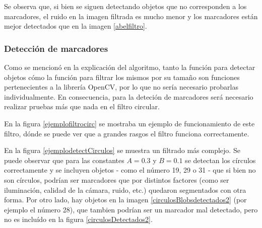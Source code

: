 Se observa que, si bien se siguen detectando objetos que no corresponden a los marcadores, el ruido en la imagen filtrada es mucho menor y los marcadores están mejor detectados que en la imagen \ref{abelfiltro}.

\subsubsection{Detección de marcadores}

Como se mencionó en la explicación del algoritmo, tanto la función para detectar objetos cómo la función para filtrar los mismos por su tamaño son funciones pertenecientes a la librería OpenCV\cite{opencv}, por lo que no sería necesario probarlas individualmente. En consecuencia, para la deteción de marcadores será necesario realizar pruebas más que nada en el filtro circular.

En la figura \ref{ejemplofiltrocirc} se mostraba un ejemplo de funcionamiento de este filtro, dónde se puede ver que a grandes rasgos el filtro funciona correctamente. 

En la figura \ref{ejemplodetectCirculos} se muestra un filtrado más complejo. Se puede observar que para las constantes $A=0.3$ y $B=0.1$ se detectan los círculos correctamente y se incluyen objetos - como el número 19, 29 o 31 - que si bien no son círculos, podrían ser marcadores que por distintos factores (como ser iluminación, calidad de la cámara, ruido, etc.) quedaron segmentados con otra forma. Por otro lado, hay objetos en la imagen \ref{circulosBlobsdetectados2} (por ejemplo el número 28), que tambien podrían ser un marcador mal detectado, pero no es incluído en la figura \ref{circulosDetectados2}.



